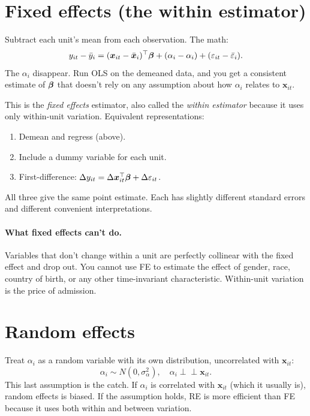 \section{Fixed effects (the within estimator)}

Subtract each unit's mean from each observation. The math:
\[
  y_{it} - \bar y_i = (\bm{x}_{it} - \bar{\bm{x}}_i)^\top \bm{\beta} + (\alpha_i - \alpha_i) + (\varepsilon_{it} - \bar\varepsilon_i).
\]
The $\alpha_i$ disappear. Run OLS on the demeaned data, and you get a consistent estimate of $\bm{\beta}$ that doesn't rely on any assumption about how $\alpha_i$ relates to $\bm{x}_{it}$.

This is the \emph{fixed effects} estimator, also called the \emph{within estimator} because it uses only within-unit variation. Equivalent representations:
\begin{enumerate}[noitemsep]
\item Demean and regress (above).
\item Include a dummy variable for each unit.
\item First-difference: $\Delta y_{it} = \Delta \bm{x}_{it}^\top \bm{\beta} + \Delta \varepsilon_{it}$.
\end{enumerate}
All three give the same point estimate. Each has slightly different standard errors and different convenient interpretations.

\paragraph{What fixed effects can't do.} Variables that don't change within a unit are perfectly collinear with the fixed effect and drop out. You cannot use FE to estimate the effect of gender, race, country of birth, or any other time-invariant characteristic. Within-unit variation is the price of admission.

\section{Random effects}

Treat $\alpha_i$ as a random variable with its own distribution, uncorrelated with $\bm{x}_{it}$:
\[
  \alpha_i \sim N(0, \sigma_\alpha^2), \quad \alpha_i \perp \!\!\! \perp \bm{x}_{it}.
\]
This last assumption is the catch. If $\alpha_i$ is correlated with $\bm{x}_{it}$ (which it usually is), random effects is biased. If the assumption holds, RE is more efficient than FE because it uses both within and between variation.

